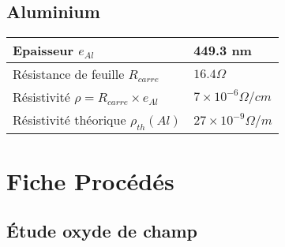 \documentclass[11pt]{article}
\begin{document}
\subsection{Aluminium}

	\begin{center}
    \noindent \begin{tabular}[!htb]{ | p{7cm} | p{7cm} | }
    \hline
    Epaisseur $e_{Al}$ & 449.3 nm \\ \hline
    R\'esistance de feuille $R_{carre}$ & $16.4 \Omega$ \\ \hline
    R\'esistivit\'e       $\rho = R_{carre} \times e_{Al}$ & $7 \times 10^{-6} \Omega/cm$ \\ \hline
    R\'esistivit\'e th\'eorique  $\rho_{th}(Al)$  & $27 \times 10^{-9} \Omega/m$ \\
    \hline
    \end{tabular}
    \end{center}

\section{Fiche Proc\'ed\'es}

\subsection{\'Etude oxyde de champ}
\end{document}
